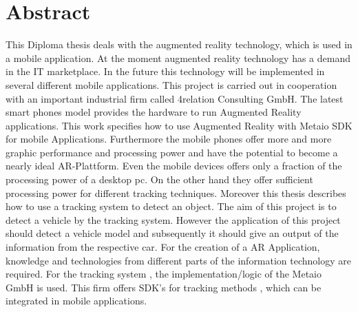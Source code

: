 \chapter*{Abstract}

This Diploma thesis deals with the augmented reality technology, which is used in a mobile application. At the moment augmented reality technology has a demand in the IT marketplace. In the future this technology will be implemented in several different mobile applications. This project is carried out in cooperation with an important industrial firm called 4relation Consulting GmbH. The latest smart phones model provides the hardware to run Augmented Reality applications. This work specifies how to use Augmented Reality with Metaio SDK for mobile Applications. Furthermore the mobile phones offer more and more graphic performance and processing power and have the potential to become a nearly ideal AR-Plattform. Even the mobile devices offers only a fraction of the processing power of a desktop pc. On the other hand they offer sufficient processing power for different tracking techniques. Moreover this thesis describes how to use a tracking system to detect an object. The aim of this project is to detect a vehicle by the tracking system. However the application of this project should detect a vehicle model and subsequently it should give an output of the information from the respective car. For the creation of a AR Application, knowledge and technologies from different parts of the information technology are required. For the tracking system , the implementation/logic of the Metaio GmbH is used. This firm offers SDK's for tracking methods , which can be integrated in mobile applications.